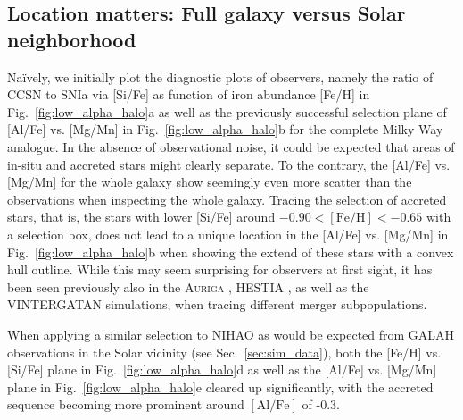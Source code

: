 \documentclass[fleqn,usenatbib]{mnras}
\begin{document}
\subsection{Location matters: Full galaxy versus Solar neighborhood} \label{sec:location}

Naïvely, we initially plot the diagnostic plots of observers, namely the ratio of CCSN to SNIa via [Si/Fe] as function of iron abundance [Fe/H] in Fig.~\ref{fig:low_alpha_halo}a as well as the previously successful selection plane of [Al/Fe] vs. [Mg/Mn] in Fig.~\ref{fig:low_alpha_halo}b for the complete Milky Way analogue. In the absence of observational noise, it could be expected that areas of in-situ and accreted stars might clearly separate. To the contrary, the [Al/Fe] vs. [Mg/Mn] for the whole galaxy show seemingly even more scatter than the observations when inspecting the whole galaxy. Tracing the selection of accreted stars, that is, the stars with lower [Si/Fe] around $-0.90 < \mathrm{[Fe/H]} < -0.65$ with a selection box, does not lead to a unique location in the [Al/Fe] vs. [Mg/Mn] in Fig.~\ref{fig:low_alpha_halo}b when showing the extend of these stars with a convex hull outline. While this may seem surprising for observers at first sight, it has been seen previously also in the \textsc{Auriga} \citep[][]{Grand2020, Orkney2022}, \textsc{HESTIA} \citep[][see their Fig.~12]{Khoperskov2023c},  as well as the \textsc{VINTERGATAN} \citep[][see their Fig.~A2]{Rey2023} simulations, when tracing different merger subpopulations.

When applying a similar selection to NIHAO as would be expected from GALAH observations in the Solar vicinity (see Sec.~\ref{sec:sim_data}), both the [Fe/H] vs. [Si/Fe] plane in Fig.~\ref{fig:low_alpha_halo}d as well as the [Al/Fe] vs. [Mg/Mn] plane in Fig.~\ref{fig:low_alpha_halo}e cleared up significantly, with the accreted sequence becoming more prominent around $\mathrm{[Al/Fe]}$ of -0.3.
\end{document}
